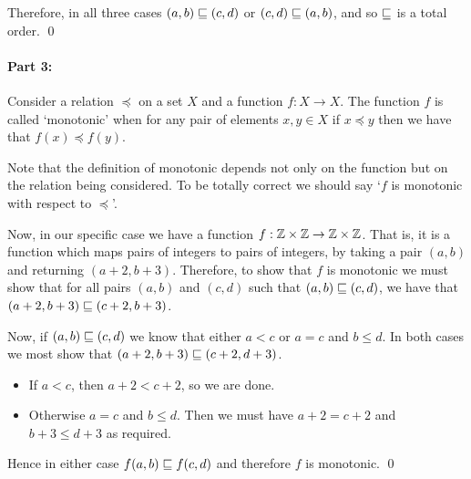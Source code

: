 Therefore, in all three cases $(a, b) \sqsubseteq (c, d)$ or $(c, d) \sqsubseteq (a, b)$, and so $\sqsubseteq$ is a total order. \qed

\paragraph{Part 3:}
Consider a relation $\preceq$ on a set $X$ and a function $f: X \to X$.
The function $f$ is called `monotonic' when for any pair of elements $x, y \in X$ if $x \preceq y$ then we have that $f (x) \preceq f(y)$.

Note that the definition of monotonic depends not only on the function but on the relation being considered. To be totally correct we should say `$f$ is monotonic with respect to $\preceq$'.

Now, in our specific case we have a function $f: \mathbb{Z} \times \mathbb{Z} \to \mathbb{Z} \times \mathbb{Z}$. That is, it is a function which maps pairs of integers to pairs of integers, by taking a pair $(a, b)$ and returning $(a+2, b+3)$.
Therefore, to show that $f$ is monotonic we must show that for all pairs $(a, b)$ and $(c, d)$ such that $(a, b) \sqsubseteq (c, d)$, we have that $(a+2, b+3) \sqsubseteq (c + 2, b + 3)$.

Now, if $(a, b) \sqsubseteq (c, d)$ we know that either $a < c$ or $a = c$ and $b \leq d$. In both cases we most show that $(a+2, b+3) \sqsubseteq (c+2, d+3)$.
\begin{itemize}
\item If $a < c$, then $a + 2 < c + 2$, so we are done.
\item Otherwise $a = c$ and $b \leq d$. Then we must have $a + 2 = c+2$ and $b + 3 \leq d + 3$ as required.
\end{itemize}
Hence in either case $f (a, b) \sqsubseteq f(c, d)$ and therefore $f$ is monotonic. \qed

